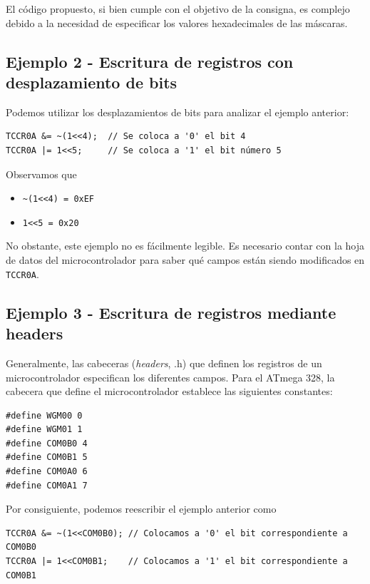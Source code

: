 \documentclass[paper=a4, fontsize=11pt]{scrartcl}	%
\numberwithin{equation}{section} %
\numberwithin{figure}{section} %
\numberwithin{table}{section} %
\begin{document}
El código propuesto, si bien cumple con el objetivo de la consigna, es
complejo debido a la necesidad de especificar los valores hexadecimales de
las máscaras.

\subsection{Ejemplo 2 - Escritura de registros con desplazamiento de bits}

Podemos utilizar los desplazamientos de bits para analizar el ejemplo
anterior:

\begin{verbatim}
TCCR0A &= ~(1<<4);  // Se coloca a '0' el bit 4
TCCR0A |= 1<<5;     // Se coloca a '1' el bit número 5
\end{verbatim}

Observamos que 
\begin{itemize}
    \item \verb!~(1<<4) = 0xEF!
    \item \verb!1<<5 = 0x20!
\end{itemize}
No obstante, este ejemplo no es fácilmente legible. Es necesario contar
con la hoja de datos del microcontrolador para saber qué campos están
siendo modificados en \verb|TCCR0A|.

\subsection{Ejemplo 3 - Escritura de registros mediante headers}

Generalmente, las cabeceras (\emph{headers}, .h) que definen los
registros de un microcontrolador especifican los diferentes
campos. Para el ATmega 328, la
cabecera que define el microcontrolador establece las siguientes
constantes:

\begin{verbatim}
#define WGM00 0
#define WGM01 1
#define COM0B0 4
#define COM0B1 5
#define COM0A0 6
#define COM0A1 7
\end{verbatim}
Por consiguiente, podemos reescribir el ejemplo anterior como
\begin{verbatim}
TCCR0A &= ~(1<<COM0B0); // Colocamos a '0' el bit correspondiente a COM0B0
TCCR0A |= 1<<COM0B1;    // Colocamos a '1' el bit correspondiente a COM0B1
\end{verbatim}
\end{document}
